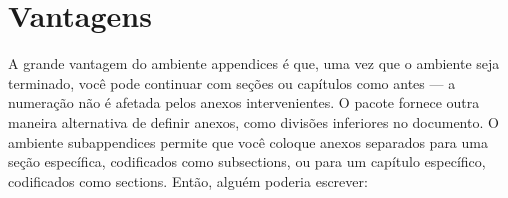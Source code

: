 \chapter{Vantagens}
A grande vantagem do ambiente appendices é que, uma vez que o ambiente seja terminado, você pode continuar com seções ou capítulos como antes — a numeração não é afetada pelos anexos intervenientes.
O pacote fornece outra maneira alternativa de definir anexos, como divisões inferiores no documento. O ambiente subappendices permite que você coloque anexos separados para uma seção específica, codificados como subsections, ou para um capítulo específico, codificados como sections. Então, alguém poderia escrever: